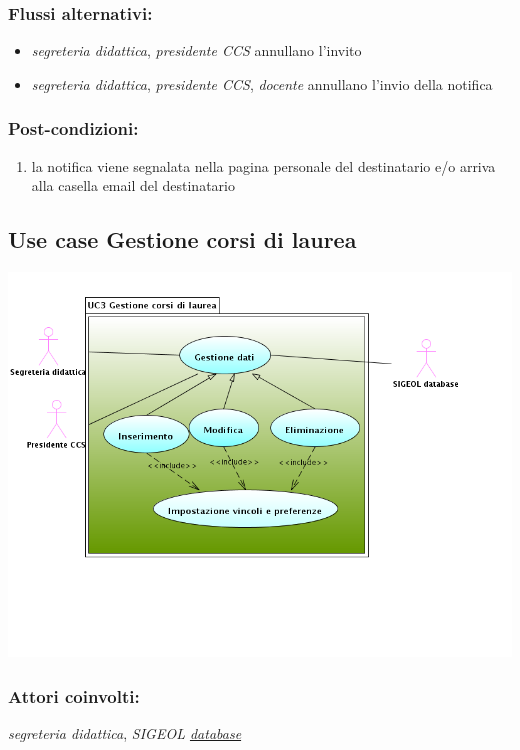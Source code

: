 \documentclass[11pt,a4paper]{article}
\begin{document}
\subsubsection*{Flussi alternativi:}
\begin{itemize}
\item \textit{segreteria didattica}, \textit{presidente CCS} annullano l'invito
\item \textit{segreteria didattica}, \textit{presidente CCS}, \textit{docente} annullano l'invio della notifica
\end{itemize}
\subsubsection*{Post-condizioni:}
\begin{enumerate}
 \item la notifica viene segnalata nella pagina personale del destinatario e/o arriva alla casella email del destinatario
\end{enumerate}
\subsection{Use case Gestione corsi di laurea}
\begin{center} 
 \includegraphics[scale=0.5]{images/UseCaseGestioneCorsiLaurea.png}
\end{center}
\subsubsection*{Attori coinvolti:}
\textit{segreteria didattica}, \textit{SIGEOL \underline{database}}
\end{document}
